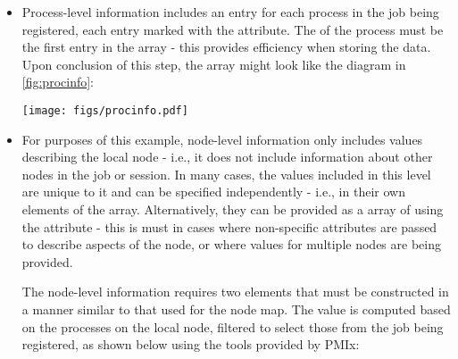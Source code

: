\begin{itemize}
Upon conclusion of this step, the  array might look like that shown in \ref{fig:appinfo}, assuming there are two applications in the job being registered:

\begingroup
\begin{figure*}[ht!]
  \begin{center}
    \texttt{[image: figs/appinfo.pdf]}
  \end{center}
  \caption{Application-level information elements}
  \label{fig:appinfo}
\end{figure*}
\endgroup

\item Process-level information includes an entry for each process in the job being registered, each entry marked with the  attribute. The  of the process must be the first entry in the array - this provides efficiency when storing the data. Upon conclusion of this step, the  array might look like the diagram in \ref{fig:procinfo}:

\begingroup
\begin{figure*}[ht!]
  \begin{center}
    \texttt{[image: figs/procinfo.pdf]}
  \end{center}
  \caption{Process-level information elements}
  \label{fig:procinfo}
\end{figure*}
\endgroup

\item For purposes of this example, node-level information only includes values describing the local node - i.e., it does not include information about other nodes in the job or session. In many cases, the values included in this level are unique to it and can be specified independently - i.e., in their own  elements of the  array. Alternatively, they can be provided as a  array of  using the  attribute - this is must in cases where non-specific attributes are passed to describe aspects of the node, or where values for multiple nodes are being provided.

The node-level information requires two elements that must be constructed in a manner similar to that used for the node map. The  value is computed based on the processes on the local node, filtered to select those from the job being registered, as shown below using the tools provided by \ac{PMIx}:


\end{itemize}
